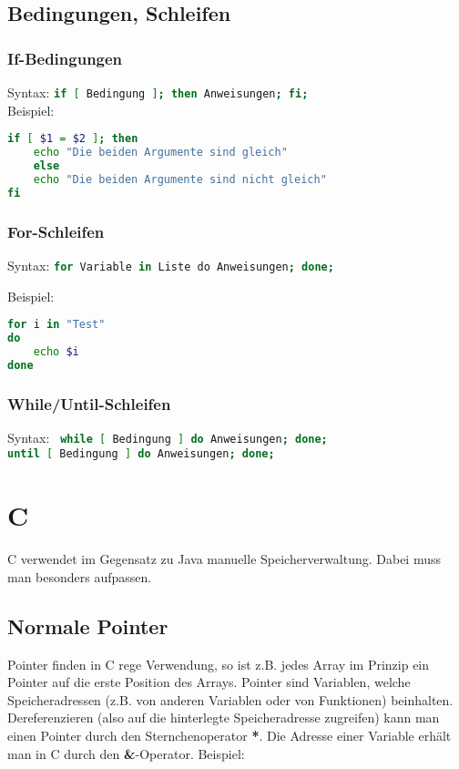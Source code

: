 \documentclass[11pt]{scrartcl}
\begin{document}
\subsection{Bedingungen, Schleifen}

\subsubsection{If-Bedingungen}
Syntax: \lstinline[language=Bash]!if [ Bedingung ]; then Anweisungen; fi;! \\
Beispiel:\\

\begin{lstlisting}[language=Bash]
if [ $1 = $2 ]; then
	echo "Die beiden Argumente sind gleich"
    else
	echo "Die beiden Argumente sind nicht gleich"
fi
\end{lstlisting}

\subsubsection{For-Schleifen}
Syntax: \lstinline[language=Bash]!for Variable in Liste do Anweisungen; done;!

Beispiel:\\
\begin{lstlisting}[language=Bash]
for i in "Test"
do
	echo $i
done
\end{lstlisting}

\subsubsection{While/Until-Schleifen}
Syntax: \lstinline[language=Bash]! while [ Bedingung ] do Anweisungen; done;!\\
\lstinline[language=Bash]!until [ Bedingung ] do Anweisungen; done;!\\

\section{C}
C verwendet im Gegensatz zu Java manuelle Speicherverwaltung. Dabei muss man besonders aufpassen. %

\subsection{Normale Pointer} %
Pointer finden in C rege Verwendung, so ist z.B. jedes Array im Prinzip ein Pointer auf die erste Position des Arrays. Pointer sind Variablen, welche Speicheradressen (z.B. von anderen Variablen oder von Funktionen) beinhalten.
Dereferenzieren (also auf die hinterlegte Speicheradresse zugreifen) kann man einen Pointer durch den Sternchenoperator \textbf{*}. Die Adresse einer Variable erhält man in C durch den \textbf{\&}-Operator. Beispiel:\\
\end{document}
